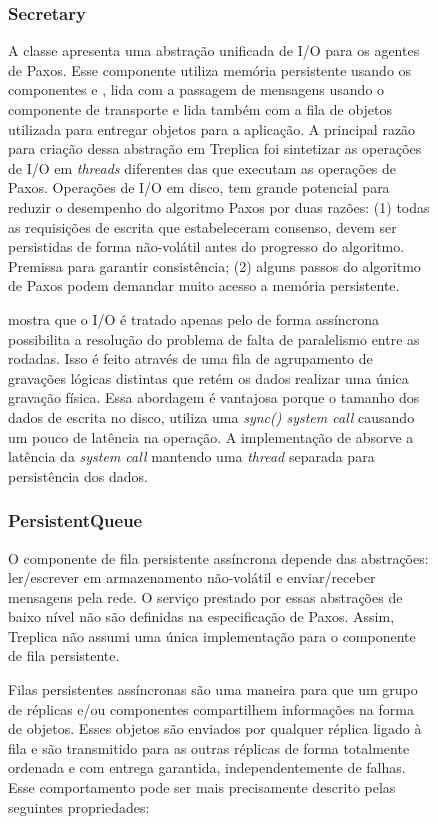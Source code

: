 \begin{figure}[ht]
\subsubsection{Secretary}

A classe  apresenta uma abstração unificada de I/O para os agentes de
Paxos. Esse componente utiliza memória persistente usando os componentes
 e , lida com a passagem de mensagens usando o
componente de transporte e lida também com a fila de objetos utilizada para entregar
objetos para a aplicação. A principal razão para criação dessa abstração em Treplica foi
sintetizar as operações de I/O em \emph{threads} diferentes das que executam as operações
de Paxos. Operações de I/O em disco, tem grande potencial para reduzir o desempenho do
algoritmo Paxos por duas razões: (1) todas as requisições de escrita que estabeleceram
consenso, devem ser persistidas de forma não-volátil antes do progresso do algoritmo.
Premissa para garantir consistência; (2) alguns passos do algoritmo de Paxos podem
demandar muito acesso a memória persistente.

 mostra que o I/O é tratado apenas pelo  de
forma assíncrona possibilita a resolução do problema de falta de paralelismo entre as
rodadas. Isso é feito através de uma fila de agrupamento de gravações lógicas distintas
que retém os dados realizar uma única gravação física. Essa abordagem é vantajosa porque o
tamanho dos dados de escrita no disco, utiliza uma \emph{sync() system call} causando um
pouco de latência na operação. A implementação de  absorve a latência
da \emph{system call} mantendo uma \emph{thread} separada para persistência dos dados.

\subsubsection{PersistentQueue}

O componente de fila persistente assíncrona depende das abstrações: ler/escrever em
armazenamento não-volátil e enviar/receber mensagens pela rede. O serviço prestado por
essas abstrações de baixo nível não são definidas na especificação de Paxos. Assim,
Treplica não assumi uma única implementação para o componente de fila persistente.

Filas persistentes assíncronas são uma maneira para que um grupo de réplicas e/ou
componentes compartilhem informações na forma de objetos. Esses objetos são enviados por
qualquer réplica ligado à fila e são transmitido para as outras réplicas de forma
totalmente ordenada e com entrega garantida, independentemente de falhas. Esse
comportamento pode ser mais precisamente descrito pelas seguintes propriedades:


\end{figure}
